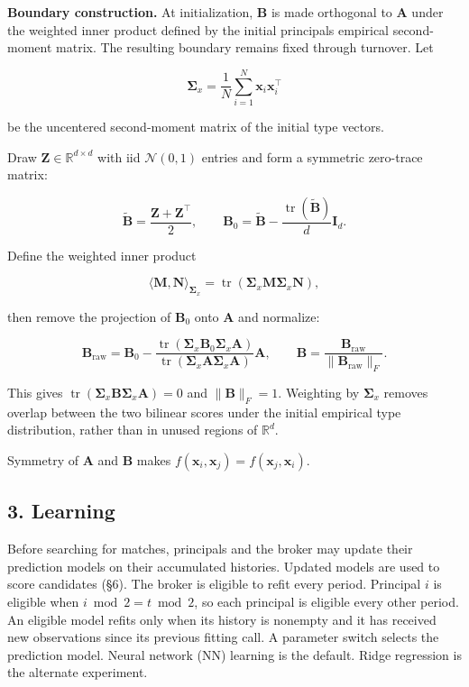 \documentclass[11pt]{article}
\begin{document}
\textbf{Boundary construction.} At initialization, \(\mathbf{B}\) is made orthogonal to \(\mathbf{A}\) under the weighted inner product defined by the initial principals\textquotesingle{} empirical second-moment matrix. The resulting boundary remains fixed through turnover. Let

\[\boldsymbol{\Sigma}_x = \frac{1}{N} \sum_{i=1}^N \mathbf{x}_i \mathbf{x}_i^\top\]

be the uncentered second-moment matrix of the initial type vectors.

Draw \(\mathbf{Z}\in\mathbb{R}^{d\times d}\) with iid \(\mathcal{N}(0,1)\) entries and form a symmetric zero-trace matrix:

\[
\widetilde{\mathbf B}=\frac{\mathbf Z+\mathbf Z^\top}{2},
\qquad
\mathbf{B}_0 = \widetilde{\mathbf B} - \frac{\operatorname{tr}(\widetilde{\mathbf B})}{d}\mathbf{I}_d.
\]

Define the weighted inner product

\[\langle \mathbf{M}, \mathbf{N} \rangle_{\boldsymbol{\Sigma}_x} = \operatorname{tr}(\boldsymbol{\Sigma}_x \mathbf{M} \boldsymbol{\Sigma}_x \mathbf{N}),\]

then remove the projection of \(\mathbf{B}_0\) onto \(\mathbf{A}\) and normalize:

\[\mathbf{B}_{\text{raw}} = \mathbf{B}_0 - \frac{\operatorname{tr}(\boldsymbol{\Sigma}_x \mathbf{B}_0 \boldsymbol{\Sigma}_x \mathbf{A})}{\operatorname{tr}(\boldsymbol{\Sigma}_x \mathbf{A} \boldsymbol{\Sigma}_x \mathbf{A})} \mathbf{A}, \qquad \mathbf{B} = \frac{\mathbf{B}_{\text{raw}}}{\lVert \mathbf{B}_{\text{raw}} \rVert_F}.\]

This gives \(\operatorname{tr}(\boldsymbol{\Sigma}_x\mathbf{B}\boldsymbol{\Sigma}_x\mathbf{A})=0\) and \(\|\mathbf{B}\|_F=1\). Weighting by \(\boldsymbol{\Sigma}_x\) removes overlap between the two bilinear scores under the initial empirical type distribution, rather than in unused regions of \(\mathbb{R}^d\).

Symmetry of \(\mathbf{A}\) and \(\mathbf{B}\) makes \(f(\mathbf{x}_i,\mathbf{x}_j)=f(\mathbf{x}_j,\mathbf{x}_i)\).

\subsection{3. Learning}\label{learning}

Before searching for matches, principals and the broker may update their prediction models on their accumulated histories. Updated models are used to score candidates (§6). The broker is eligible to refit every period. Principal \(i\) is eligible when \(i\bmod 2=t\bmod 2\), so each principal is eligible every other period. An eligible model refits only when its history is nonempty and it has received new observations since its previous fitting call. A parameter switch selects the prediction model. Neural network (NN) learning is the default. Ridge regression is the alternate experiment.
\end{document}
